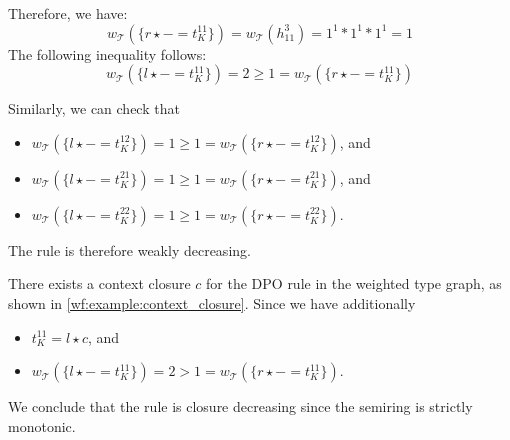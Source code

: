\begin{example}
\begin{figure}[H]
{
        }
        \caption{}
        \label{wf:example:context_closure_grs_aa}
      \end{figure}
    Therefore, we have: 
        $$w_\mathcal{T}(\{r \star - = t_K^{11}\}) = w_\mathcal{T}(h_{11}^3) = 1^1 * 1^1 * 1 ^ 1 = 1$$ 
    The following inequality follows:
     $$w_\mathcal{T}(\{l \star - = t_K^{11}\}) = 2 \geq 1 = w_\mathcal{T}(\{r \star - = t_K^{11}\})$$

    Similarly, we can check that
        \begin{itemize}
            \item $w_\mathcal{T}(\{l \star - = t_K^{12}\}) = 1 \geq 1 = w_\mathcal{T}(\{r \star - = t_K^{12}\})$, and
            \item $w_\mathcal{T}(\{l \star - = t_K^{21}\}) = 1 \geq 1 = w_\mathcal{T}(\{r \star - = t_K^{21}\})$, and
            \item $w_\mathcal{T}(\{l \star - = t_K^{22}\}) = 1 \geq 1 = w_\mathcal{T}(\{r \star - = t_K^{22}\})$.
        \end{itemize}  
     The rule is therefore weakly decreasing.

    There exists a context closure $c$ for the DPO rule in the weighted type graph, as shown in \autoref{wf:example:context_closure}.
    Since we have additionally 
        \begin{itemize}
            \item $t_K^{11} = l \star c$, and
            \item $w_\mathcal{T}(\{l \star - = t_K^{11}\}) = 2 > 1 = w_\mathcal{T}(\{r \star - = t_K^{11}\})$.
        \end{itemize}
       We conclude that the rule is closure decreasing since the semiring is strictly monotonic.
\end{example} 
 
